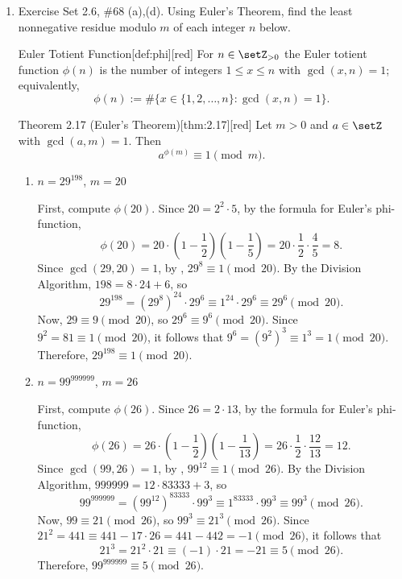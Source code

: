 \begin{enumerate}
  \newpage
  \item Exercise Set 2.6, \#68 (a),(d).
  Using Euler's Theorem, find the least nonnegative residue modulo $m$ of each integer $n$ below.
  \begin{define}{Euler Totient Function}[def:phi][red]
  For $n\in\setZ_{>0}$ the Euler totient function $\phi(n)$ is the number of integers
  $1\le x\le n$ with $\gcd(x,n)=1$; equivalently,
  \[
  \phi(n):=\#\{x\in\{1,2,\dots,n\}:\gcd(x,n)=1\}.
  \]
  \end{define}
  \begin{define}{Theorem 2.17 (Euler's Theorem)}[thm:2.17][red]
  Let $m>0$ and $a\in\setZ$ with $\gcd(a,m)=1$. Then
  \[
  a^{\phi(m)}\equiv 1\pmod m.
  \]
  \end{define}
  \begin{enumerate}
    \item $n=29^{198}$, $m=20$
    \begin{subanswer}
      First, compute $\phi(20)$. Since $20 = 2^2 \cdot 5$, by the formula for Euler's phi-function,
      \[
      \phi(20) = 20 \cdot \left(1 - \frac{1}{2}\right)\left(1 - \frac{1}{5}\right) = 20 \cdot \frac{1}{2} \cdot \frac{4}{5} = 8.
      \]
      Since $\gcd(29, 20) = 1$, by , $29^8 \equiv 1 \pmod{20}$.
      By the Division Algorithm, $198 = 8 \cdot 24 + 6$, so
      \[
      29^{198} = (29^8)^{24} \cdot 29^6 \equiv 1^{24} \cdot 29^6 \equiv 29^6 \pmod{20}.
      \]
      Now, $29 \equiv 9 \pmod{20}$, so $29^6 \equiv 9^6 \pmod{20}$.
      Since $9^2 = 81 \equiv 1 \pmod{20}$, it follows that $9^6 = (9^2)^3 \equiv 1^3 = 1 \pmod{20}$.
      Therefore, $29^{198} \equiv 1 \pmod{20}$.
    \end{subanswer}
    \item $n=99^{999999}$, $m=26$
    \begin{subanswer}
      First, compute $\phi(26)$. Since $26 = 2 \cdot 13$, by the formula for Euler's phi-function,
      \[
      \phi(26) = 26 \cdot \left(1 - \frac{1}{2}\right)\left(1 - \frac{1}{13}\right) = 26 \cdot \frac{1}{2} \cdot \frac{12}{13} = 12.
      \]
      Since $\gcd(99, 26) = 1$, by , $99^{12} \equiv 1 \pmod{26}$.
      By the Division Algorithm, $999999 = 12 \cdot 83333 + 3$, so
      \[
      99^{999999} = (99^{12})^{83333} \cdot 99^3 \equiv 1^{83333} \cdot 99^3 \equiv 99^3 \pmod{26}.
      \]
      Now, $99 \equiv 21 \pmod{26}$, so $99^3 \equiv 21^3 \pmod{26}$.
      Since $21^2 = 441 \equiv 441 - 17 \cdot 26 = 441 - 442 = -1 \pmod{26}$, it follows that 
      \[
      21^3 = 21^2 \cdot 21 \equiv (-1) \cdot 21 = -21 \equiv 5 \pmod{26}.
      \]
      Therefore, $99^{999999} \equiv 5 \pmod{26}$.
    \end{subanswer}
  \end{enumerate}



\end{enumerate}
